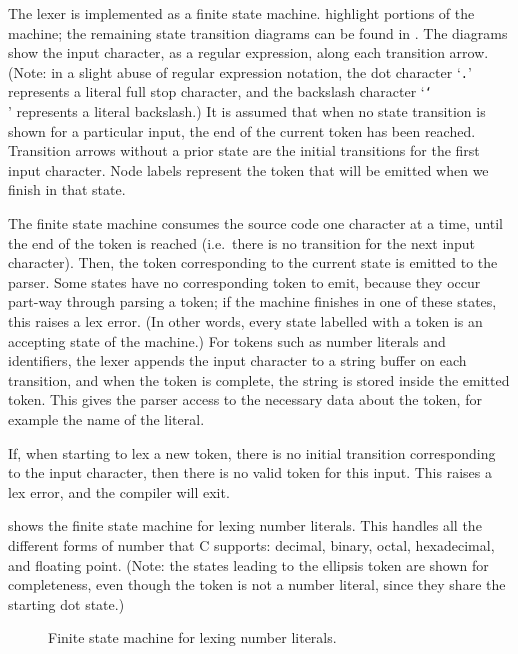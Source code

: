 \documentclass[00-main.tex]{subfiles}
\begin{document}
The lexer is implemented as a finite state machine.  highlight portions of the machine; the remaining state transition diagrams can be found in .
The diagrams show the input character, as a regular expression, along each transition arrow. (Note: in a slight abuse of regular expression notation, the dot character `\texttt{.}' represents a literal full stop character, and the backslash character `\texttt{\char`\\}' represents a literal backslash.)
It is assumed that when no state transition is shown for a particular input, the end of the current token has been reached.
Transition arrows without a prior state are the initial transitions for the first input character.
Node labels represent the token that will be emitted when we finish in that state.

The finite state machine consumes the source code one character at a time, until the end of the token is reached (i.e.\ there is no transition for the next input character).
Then, the token corresponding to the current state is emitted to the parser.
Some states have no corresponding token to emit, because they occur part-way through parsing a token; if the machine finishes in one of these states, this raises a lex error.
(In other words, every state labelled with a token is an accepting state of the machine.)
For tokens such as number literals and identifiers, the lexer appends the input character to a string buffer on each transition, and when the token is complete, the string is stored inside the emitted token.
This gives the parser access to the necessary data about the token, for example the name of the literal.

If, when starting to lex a new token, there is no initial transition corresponding to the input character, then there is no valid token for this input. This raises a lex error, and the compiler will exit.

 shows the finite state machine for lexing number literals. This handles all the different forms of number that C supports: decimal, binary, octal, hexadecimal, and floating point.
(Note: the states leading to the ellipsis token are shown for completeness, even though the token is not a number literal, since they share the starting dot state.)

\begin{figure}[ht]
  \centering
  \caption{Finite state machine for lexing number literals.}
  \label{fig:lexing numbers fsm}
\end{figure}
\end{document}
